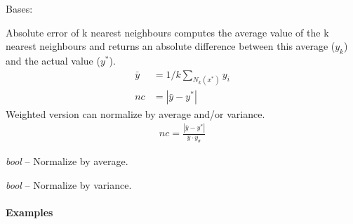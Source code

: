 \documentclass[letterpaper,10pt,english]{sphinxmanual}
\begin{document}

\begin{fulllineitems}
\label{cp.nonconformity:cp.nonconformity.AbsErrorKNN}
Bases: {\hyperref[cp.nonconformity:cp.nonconformity.RegrNearestNeighboursNC]{}}

Absolute error of k nearest neighbours computes the average value of the k nearest neighbours and
returns an absolute difference between this average (\(y_k\)) and the actual value (\(y^{*}\)).
\begin{equation*}
\begin{split}\bar{y} &= 1/k \sum_{N_k(x^{*})} y_i \\
\mathit{nc} &= |\bar{y} - y^{*}|\end{split}
\end{equation*}
Weighted version can normalize by average and/or variance.
\begin{equation*}
\begin{split}\mathit{nc} = \frac{ |\bar{y}-y^{*}| } { \bar{y} \cdot y_{\sigma} }\end{split}
\end{equation*}

\begin{fulllineitems}
\label{cp.nonconformity:cp.nonconformity.AbsErrorKNN.average}
\emph{bool} -- Normalize by average.

\end{fulllineitems}


\begin{fulllineitems}
\label{cp.nonconformity:cp.nonconformity.AbsErrorKNN.variance}
\emph{bool} -- Normalize by variance.

\end{fulllineitems}

\paragraph{Examples}


\end{fulllineitems}
\end{document}
